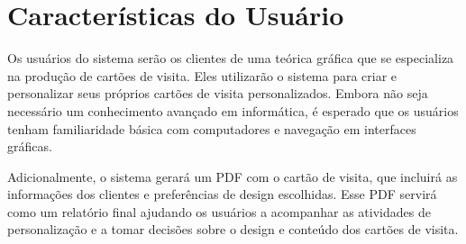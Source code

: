 \section{Características do Usuário}

Os usuários do sistema serão os clientes de uma teórica gráfica que se especializa na produção de cartões de visita. Eles utilizarão o sistema para criar e personalizar seus próprios cartões de visita personalizados. Embora não seja necessário um conhecimento avançado em informática, é esperado que os usuários tenham familiaridade básica com computadores e navegação em interfaces gráficas.

Adicionalmente, o sistema gerará um PDF com o cartão de visita, que incluirá as informações dos clientes e preferências de design escolhidas. Esse PDF servirá como um relatório final ajudando os usuários a acompanhar as atividades de personalização e a tomar decisões sobre o design e conteúdo dos cartões de visita.
